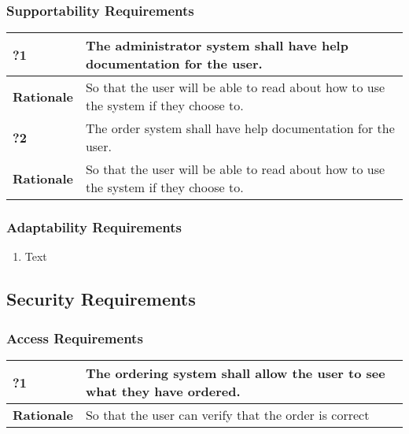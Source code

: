 \documentclass [11pt]{article}
\begin{document}
\subsubsection{Supportability Requirements }

\begin{longtable}{| p{ } | p{ } | }\hline 
	\rowcolor{tableCell}\textbf{?1} & The administrator system shall have help documentation for the user. \\ \hline
	\textbf{Rationale} &  So that the user will be able to read about how to use the system if they choose to.\\ \hline 
	\rowcolor{tableCell}\textbf{?2} & The order system shall have help documentation for the user. \\ \hline
	\textbf{Rationale} & So that the user will be able to read about how to use the system if they choose to.\\ \hline 
\end{longtable}
\subsubsection{Adaptability Requirements}
	\begin{enumerate}[label=\textbf{(\roman*)}]
		\item Text
	\end{enumerate}

\subsection{Security Requirements }

\subsubsection{Access Requirements }

\begin{longtable}{| p{ } | p{ } | }\hline 
	\rowcolor{tableCell}\textbf{?1} & The ordering system shall allow the user to see what they have ordered. \\ \hline
	\textbf{Rationale} &  So that the user can verify that the order is correct\\ \hline 
\end{longtable}
\end{document}
